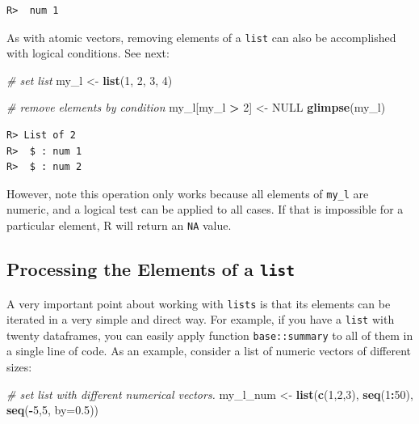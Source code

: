 \documentclass[
  12pt,
]{book}
\newenvironment{Shaded}{\begin{snugshade}}{\end{snugshade}}
\newcommand{\CommentTok}[1]{\textcolor[rgb]{0.37,0.37,0.37}{\textit{#1}}}
\newcommand{\DataTypeTok}[1]{\textcolor[rgb]{0.27,0.27,0.27}{#1}}
\newcommand{\DecValTok}[1]{\textcolor[rgb]{0.06,0.06,0.06}{#1}}
\newcommand{\FloatTok}[1]{\textcolor[rgb]{0.06,0.06,0.06}{#1}}
\newcommand{\KeywordTok}[1]{\textcolor[rgb]{0.27,0.27,0.27}{\textbf{#1}}}
\newcommand{\NormalTok}[1]{#1}
\newcommand{\OperatorTok}[1]{\textcolor[rgb]{0.43,0.43,0.43}{\textbf{#1}}}
\newcommand{\OtherTok}[1]{\textcolor[rgb]{0.37,0.37,0.37}{#1}}
\newcommand{\StringTok}[1]{\textcolor[rgb]{0.5,0.5,0.5}{#1}}
\begin{document}
\begin{verbatim}
R>  num 1
\end{verbatim}

As with atomic vectors, removing elements of a \texttt{list} can also be accomplished with logical conditions. See next:

\begin{Shaded}
\begin{Highlighting}[]
\CommentTok{# set list}
\NormalTok{my_l <-}\StringTok{ }\KeywordTok{list}\NormalTok{(}\DecValTok{1}\NormalTok{, }\DecValTok{2}\NormalTok{, }\DecValTok{3}\NormalTok{, }\DecValTok{4}\NormalTok{)}

\CommentTok{# remove elements by condition}
\NormalTok{my_l[my_l }\OperatorTok{>}\StringTok{ }\DecValTok{2}\NormalTok{] <-}\StringTok{ }\OtherTok{NULL}
\KeywordTok{glimpse}\NormalTok{(my_l)}
\end{Highlighting}
\end{Shaded}

\begin{verbatim}
R> List of 2
R>  $ : num 1
R>  $ : num 2
\end{verbatim}

However, note this operation only works because all elements of \texttt{my\_l} are numeric, and a logical test can be applied to all cases. If that is impossible for a particular element, R will return an \texttt{NA} value.

\hypertarget{processing-the-elements-of-a-list}{%
\subsection{\texorpdfstring{Processing the Elements of a \texttt{list}}{Processing the Elements of a list}}\label{processing-the-elements-of-a-list}}

A very important point about working with \texttt{lists} is that its elements can be iterated in a very simple and direct way. For example, if you have a \texttt{list} with twenty dataframes, you can easily apply function \texttt{base::summary} to all of them in a single line of code. As an example, consider a list of numeric vectors of different sizes:

\begin{Shaded}
\begin{Highlighting}[]
\CommentTok{# set list with different numerical vectors.}
\NormalTok{my_l_num <-}\StringTok{ }\KeywordTok{list}\NormalTok{(}\KeywordTok{c}\NormalTok{(}\DecValTok{1}\NormalTok{,}\DecValTok{2}\NormalTok{,}\DecValTok{3}\NormalTok{), }
                 \KeywordTok{seq}\NormalTok{(}\DecValTok{1}\OperatorTok{:}\DecValTok{50}\NormalTok{), }
                 \KeywordTok{seq}\NormalTok{(}\OperatorTok{-}\DecValTok{5}\NormalTok{,}\DecValTok{5}\NormalTok{, }\DataTypeTok{by=}\FloatTok{0.5}\NormalTok{))}
\end{Highlighting}
\end{Shaded}
\end{document}
